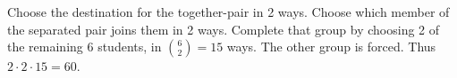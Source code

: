 Choose the destination for the together-pair in 2 ways. Choose which member of the separated pair joins them in 2 ways. Complete that group by choosing 2 of the remaining 6 students, in $\binom62=15$ ways. The other group is forced. Thus $2\cdot2\cdot15=\boxed{60}$.
